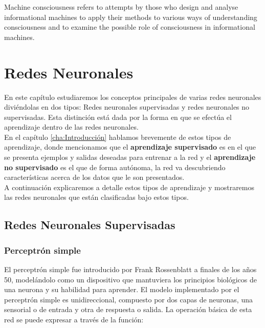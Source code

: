 \begin{savequote}[72mm]
  Machine consciousness refers to attempts by those who design and
  analyse informational machines to apply their methods to various
  ways of understanding consciousness and to examine the possible role
  of consciousness in informational machines.

\end{savequote}

\chapter{Redes Neuronales}
\label{cha:redes}

En este capítulo estudiaremos los conceptos principales de varias
redes neuronales diviéndolas en dos tipos: Redes neuronales
supervisadas y redes neuronales no supervisadas. Esta distinción está
dada por la forma en que se efectúa el aprendizaje dentro de las redes
neuronales.\\

En el capítulo \ref{cha:Introducción} hablamos brevemente de estos
tipos de aprendizaje, donde mencionamos que el \textbf{aprendizaje
supervisado} es en el que se presenta ejemplos y salidas deseadas
para entrenar a la red y el \textbf{aprendizaje no supervisado} es el
que de forma autónoma, la red va descubriendo características acerca
de los datos que le son presentados.\\

A continuación explicaremos a detalle estos tipos de aprendizaje y
mostraremos las redes neuronales que están clasificadas bajo estos
tipos.

\section{Redes Neuronales Supervisadas}


\subsection{Perceptrón simple}

El perceptrón simple fue introducido por Frank Rossenblatt a finales
de los años 50, modelándolo como un dispositivo que mantuviera los
principios biológicos de una neurona y su habilidad para aprender. El
modelo implementado por el perceptrón simple es unidireccional,
compuesto por dos capas de neuronas, una sensorial o de entrada y otra
de respuesta o salida. La operación básica de esta red se puede
expresar a través de la función:


